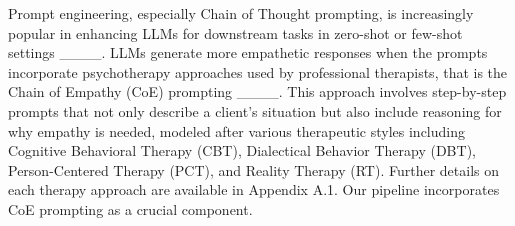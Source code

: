 Prompt engineering, especially Chain of Thought prompting, is increasingly popular in enhancing LLMs for downstream tasks in zero-shot or few-shot settings ____. LLMs generate more empathetic responses when the prompts incorporate psychotherapy approaches used by professional therapists, that is the Chain of Empathy (CoE) prompting ____. 
 This approach involves step-by-step prompts that not only describe a client’s situation but also include reasoning for why empathy is needed, modeled after various therapeutic styles including Cognitive Behavioral Therapy (CBT), Dialectical Behavior Therapy (DBT), Person-Centered Therapy (PCT), and Reality Therapy (RT). Further details on each therapy approach are available in Appendix A.1. Our pipeline incorporates  CoE prompting as a crucial component.